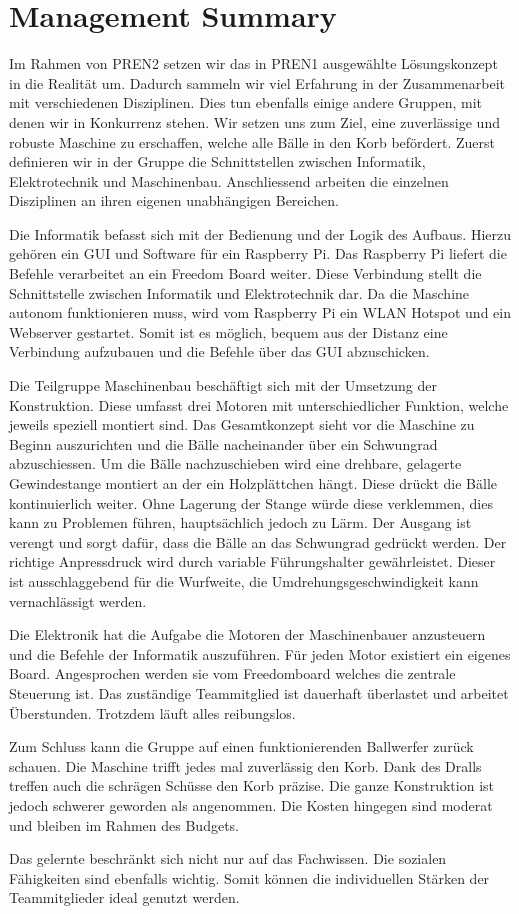 \section{Management Summary}

Im Rahmen von PREN2 setzen wir das in PREN1 ausgewählte Lösungskonzept in die Realität um. Dadurch sammeln wir viel Erfahrung in der Zusammenarbeit mit verschiedenen Disziplinen. Dies tun ebenfalls einige andere Gruppen, mit denen wir in Konkurrenz stehen. Wir setzen uns zum Ziel, eine zuverlässige und robuste Maschine zu erschaffen, welche alle Bälle in den Korb befördert.
Zuerst definieren wir in der Gruppe die Schnittstellen zwischen Informatik, Elektrotechnik und Maschinenbau. Anschliessend arbeiten die einzelnen Disziplinen an ihren eigenen unabhängigen Bereichen.

Die Informatik befasst sich mit der Bedienung und der Logik des Aufbaus. Hierzu gehören ein GUI und Software für ein Raspberry Pi. Das Raspberry Pi liefert die Befehle verarbeitet an ein Freedom Board weiter. Diese Verbindung stellt die Schnittstelle zwischen Informatik und Elektrotechnik dar. Da die Maschine autonom funktionieren muss, wird vom Raspberry Pi ein WLAN Hotspot und ein Webserver gestartet. Somit ist es möglich, bequem aus der Distanz eine Verbindung aufzubauen und die Befehle über das GUI abzuschicken.

Die Teilgruppe Maschinenbau beschäftigt sich mit der Umsetzung der Konstruktion. Diese umfasst drei Motoren mit unterschiedlicher Funktion, welche jeweils speziell montiert sind. Das Gesamtkonzept sieht vor die Maschine zu Beginn auszurichten und die Bälle nacheinander über ein Schwungrad abzuschiessen. Um die Bälle nachzuschieben wird eine drehbare, gelagerte Gewindestange montiert an der ein Holzplättchen hängt. Diese drückt die Bälle kontinuierlich weiter. Ohne Lagerung der Stange würde diese verklemmen, dies kann zu Problemen führen, hauptsächlich jedoch zu Lärm. Der Ausgang ist verengt und sorgt dafür, dass die Bälle an das Schwungrad gedrückt werden. Der richtige Anpressdruck wird durch variable Führungshalter gewährleistet. Dieser ist ausschlaggebend für die Wurfweite, die Umdrehungsgeschwindigkeit kann vernachlässigt werden.

Die Elektronik hat die Aufgabe die Motoren der Maschinenbauer anzusteuern und die Befehle der Informatik auszuführen.
Für jeden Motor existiert ein eigenes Board. Angesprochen werden sie vom Freedomboard welches die zentrale Steuerung ist.
Das zuständige Teammitglied ist dauerhaft überlastet und arbeitet Überstunden. Trotzdem läuft alles reibungslos.

Zum Schluss kann die Gruppe auf einen funktionierenden Ballwerfer zurück schauen. Die Maschine trifft jedes mal zuverlässig den Korb. Dank des Dralls treffen auch die schrägen Schüsse den Korb präzise. Die ganze Konstruktion ist jedoch schwerer geworden als angenommen. Die Kosten hingegen sind moderat und bleiben im Rahmen des Budgets.

Das gelernte beschränkt sich nicht nur auf das Fachwissen. Die sozialen Fähigkeiten sind ebenfalls wichtig. Somit können die individuellen Stärken der Teammitglieder ideal genutzt werden.